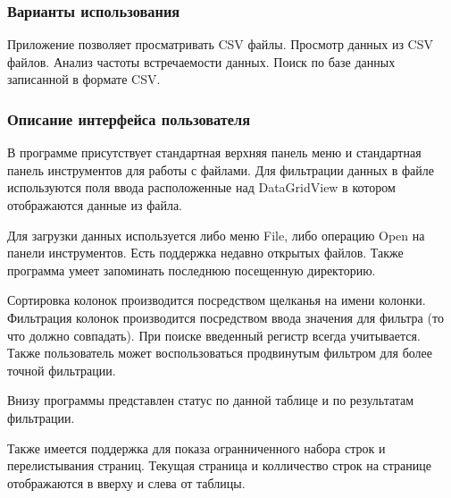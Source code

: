 \subsubsection{Варианты использования}

Приложение позволяет просматривать C\+S\+V файлы. Просмотр данных из C\+S\+V файлов. Анализ частоты встречаемости данных. Поиск по базе данных записанной в формате C\+S\+V.

\subsubsection{Описание интерфейса пользователя}

В программе присутствует стандартная верхняя панель меню и стандартная панель инструментов для работы с файлами. Для фильтрации данных в файле используются поля ввода расположенные над Data\+Grid\+View в котором отображаются данные из файла.

Для загрузки данных используется либо меню File, либо операцию Open на панели инструментов. Есть поддержка недавно открытых файлов. Также программа умеет запоминать последнюю посещенную директорию.

Сортировка колонок производится посредством щелканья на имени колонки. Фильтрация колонок производится посредством ввода значения для фильтра (то что должно совпадать). При поиске введенный регистр всегда учитывается. Также пользователь может воспользоваться продвинутым фильтром для более точной фильтрации.

Внизу программы представлен статус по данной таблице и по результатам фильтрации.

Также имеется поддержка для показа огранниченного набора строк и перелистывания страниц. Текущая страница и колличество строк на странице отображаются в вверху и слева от таблицы.

